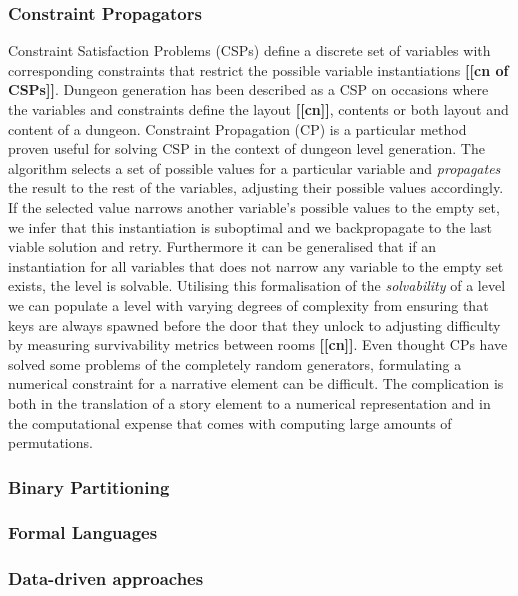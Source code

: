 \documentclass{UoYCSproject}
\begin{document}
\subsubsection{Constraint Propagators}
Constraint Satisfaction Problems (CSPs) define a discrete set of variables with corresponding constraints that restrict the possible variable instantiations \textbf{[[cn  of CSPs]]}. Dungeon generation has been described as a CSP on occasions where the variables and constraints define the layout \textbf{[[cn]]}, contents \parencite{HorswillCSPMission} or both layout and content \parencite{GreenCSPboth} of a dungeon. Constraint Propagation (CP) is a particular method proven useful for solving CSP in the context of dungeon level generation. The algorithm selects a set of possible values for a particular variable and \textit{propagates} the result to the rest of the variables, adjusting their possible values accordingly. If the selected value narrows another variable's possible values to the empty set, we infer that this instantiation is suboptimal and we backpropagate to the last viable solution and retry. Furthermore it can be generalised that if an instantiation for all variables that does not narrow any variable to the empty set exists, the level is solvable. Utilising this formalisation of the \textit{solvability} of a level we can populate a level with varying degrees of complexity from ensuring that keys are always spawned before the door that they unlock to adjusting difficulty by measuring survivability metrics between rooms \textbf{[[cn]]}. Even thought CPs have solved some problems of the completely random generators, formulating a numerical constraint for a narrative element can be difficult. The complication is both in the translation of a story element to a numerical representation and in the computational expense that comes with computing large amounts of permutations.

\subsubsection{Binary Partitioning}

\subsubsection{Formal Languages}

\subsubsection{Data-driven approaches}
\end{document}
